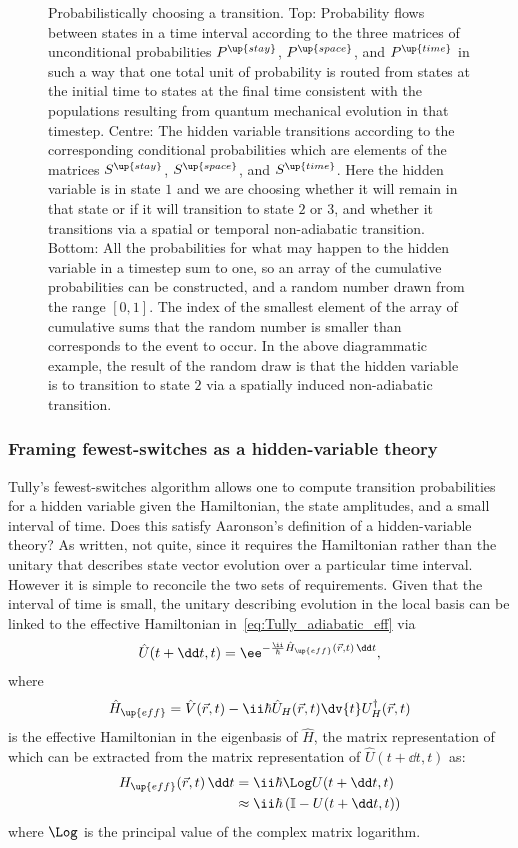 \begin{figure}[t]
    \caption{Probabilistically choosing a transition. Top: Probability flows between states in a time interval according to the three matrices of unconditional probabilities $P^\up{stay}$, $P^\up{space}$, and $P^\up{time}$ in such a way that one total unit of probability is routed from states at the initial time to states at the final time consistent with the populations resulting from quantum mechanical evolution in that timestep. Centre: The hidden variable transitions according to the corresponding conditional probabilities which are elements of the matrices $S^\up{stay}$, $S^\up{space}$, and $S^\up{time}$. Here the hidden variable is in state $1$ and we are choosing whether it will remain in that state or if it will transition to state $2$ or $3$, and whether it transitions via a spatial or temporal non-adiabatic transition. Bottom: All the probabilities for what may happen to the hidden variable in a timestep sum to one, so an array of the cumulative probabilities can be constructed, and a random number drawn from the range $[0,1]$. The index of the smallest element of the array of cumulative sums that the random number is smaller than corresponds to the event to occur. In the above diagrammatic example, the result of the random draw is that the hidden variable is to transition to state $2$ via a spatially induced non-adiabatic transition.}\label{fig:random_choice}
\end{figure}

\subsubsection{Framing fewest-switches as a hidden-variable theory}

Tully's fewest-switches algorithm allows one to compute transition probabilities for a hidden variable given the Hamiltonian, the state amplitudes, and a small interval of time. Does this satisfy Aaronson's definition of a hidden-variable theory? As written, not quite, since it requires the Hamiltonian rather than the unitary that describes state vector evolution over a particular time interval. However it is simple to reconcile the two sets of requirements. Given that the interval of time is small, the unitary describing evolution in the local basis can be linked to the effective Hamiltonian in~\eqref{eq:Tully_adiabatic_eff} via
\begin{align}
\hat U(t+\dd t, t) = \ee^{-\frac\ii\hbar\hat H_\up{eff}(\vec r, t)\,\dd t},
\end{align}
where
\begin{align}
\hat H_\up{eff} = \hat V(\vec r, t)
  - \ii\hbar\hat U_H(\vec r, t)\dv{t}U^\dagger_H(\vec r, t)
\end{align}
is the effective Hamiltonian in the eigenbasis of $\hat H$, the matrix representation of which can be extracted from the matrix representation of $\hat U(t+\dd t, t)$ as:
\begin{align}
H_\up{eff}(\vec r, t)\,\dd t &= \ii\hbar\Log U(t+\dd t, t)\\
&\approx \ii\hbar\left(\mathbb{I} -  U(t+\dd t, t)\right)
\end{align}
where $\Log$ is the principal value of the complex matrix logarithm.

